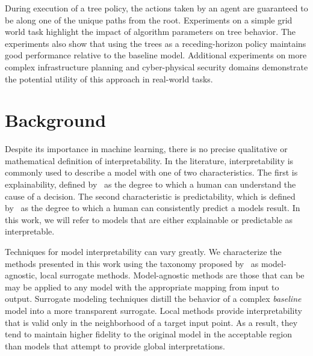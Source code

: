 \documentclass[letterpaper]{article} %
\begin{document}
During execution of a tree policy, the actions taken by an agent are guaranteed to be along one of the unique paths from the root.
Experiments on a simple grid world task highlight the impact of algorithm parameters on tree behavior.
The experiments also show that using the trees as a receding-horizon policy maintains good performance relative to the baseline model.
Additional experiments on more complex infrastructure planning and cyber-physical security domains demonstrate the potential utility of this approach in real-world tasks.
\section{Background}
Despite its importance in machine learning, there is no precise qualitative or mathematical definition of interpretability.
In the literature, interpretability is commonly used to describe a model with one of two characteristics.
The first is explainability, defined by~\citet{miller2019} as the degree to which a human can understand the cause of a decision.
The second characteristic is predictability, which is defined by~\citet{kim2016} as the degree to which a human can consistently predict a models result.
In this work, we will refer to models that are either explainable or predictable as interpretable.

Techniques for model interpretability can vary greatly.
We characterize the methods presented in this work using the taxonomy proposed by~\citet{adadi2018} as model-agnostic, local surrogate methods.
Model-agnostic methods are those that can be may be applied to any model with the appropriate mapping from input to output.
Surrogate modeling techniques distill the behavior of a complex \emph{baseline} model into a more transparent surrogate.
Local methods provide interpretability that is valid only in the neighborhood of a target input point.
As a result, they tend to maintain higher fidelity to the original model in the acceptable region than models that attempt to provide global interpretations.
\end{document}

